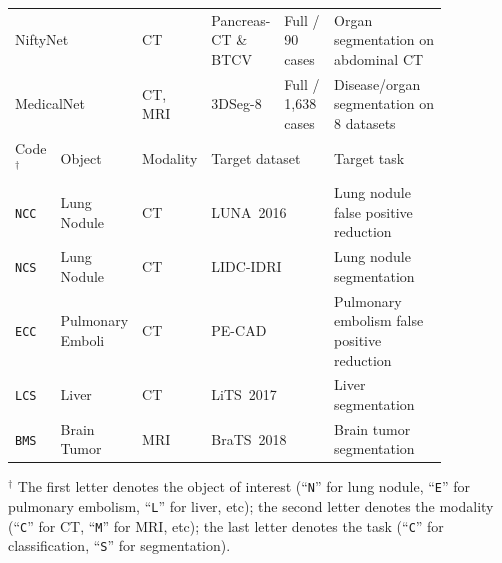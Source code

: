 \begin{table}
\begin{threeparttable}[t]
\begin{center}
\begin{tabular}{p{0.04\linewidth}p{0.14\linewidth}p{0.07\linewidth}p{0.16\linewidth}p{0.13\linewidth}p{0.32\linewidth}}
        \multicolumn{2}{l}{NiftyNet} & CT & Pancreas-CT \& BTCV & Full / 90 cases & Organ segmentation on abdominal CT \\
        \multicolumn{2}{l}{MedicalNet} & CT, MRI & 3DSeg-8 & Full / 1,638 cases & Disease/organ segmentation on 8 datasets \\
        \hline
        Code$^{\dagger}$ & Object & Modality & \multicolumn{2}{l}{Target dataset}  & Target task \\
        \hline
        \texttt{NCC} & Lung Nodule & CT & \multicolumn{2}{l}{LUNA~2016~\citep{setio2017validation}} & Lung nodule false positive reduction \\
        \texttt{NCS} & Lung Nodule & CT & \multicolumn{2}{l}{LIDC-IDRI~\citep{armato2011lung}} & Lung nodule segmentation \\
        \texttt{ECC} & Pulmonary Emboli & CT & \multicolumn{2}{l}{PE-CAD~\citep{tajbakhsh2015computer}}  & Pulmonary embolism false positive reduction \\
        \texttt{LCS} & Liver & CT & \multicolumn{2}{l}{LiTS~2017~\citep{bilic2019liver}} & Liver segmentation \\
        \texttt{BMS} & Brain Tumor & MRI & \multicolumn{2}{l}{BraTS~2018~\citep{bakas2018identifying}} & Brain tumor segmentation \\
        \hline
    \end{tabular}
    \begin{tablenotes}
        \scriptsize
        \item $^{\dagger}$ The first letter denotes the object of interest (``\texttt{N}'' for lung nodule, ``\texttt{E}'' for pulmonary embolism, ``\texttt{L}'' for liver, etc); the second letter denotes the modality (``\texttt{C}'' for CT, ``\texttt{M}'' for MRI, etc);  the last letter denotes the task (``\texttt{C}'' for classification, ``\texttt{S}'' for segmentation).
    \end{tablenotes}
\end{center}
\end{threeparttable}
\end{table}



